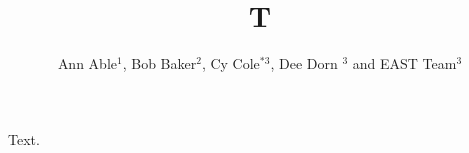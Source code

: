\documentclass[12pt]{iopart}
\begin{document}
\title{T}
\author{Ann Able$^{1}$, Bob Baker$^{2}$, Cy Cole$^{*3}$, Dee Dorn $^{3}$ and EAST Team$^{3}$}
\address{$^{1}$Univ A
\\
$^2$ Univ B
\\
$^{3}$Institute of Plasma Physics, Hefei, China}
\maketitle
Text.
\end{document}
